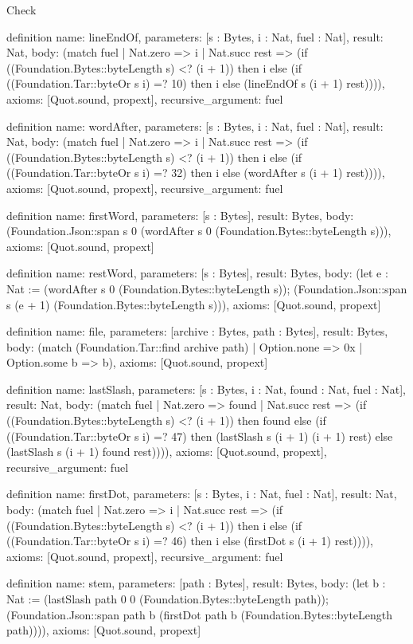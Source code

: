 \begin{lexlean}{Check}
\begin{semanticmodule}
definition{
  name: lineEndOf,
  parameters: [s : Bytes, i : Nat, fuel : Nat],
  result: Nat,
  body: (match fuel
    | Nat.zero => i
    | Nat.succ rest => (if ((Foundation.Bytes::byteLength s) <? (i + 1)) then i else (if ((Foundation.Tar::byteOr s i) =? 10) then i else (lineEndOf s (i + 1) rest)))),
  axioms: [Quot.sound, propext],
  recursive_argument: fuel
}

definition{
  name: wordAfter,
  parameters: [s : Bytes, i : Nat, fuel : Nat],
  result: Nat,
  body: (match fuel
    | Nat.zero => i
    | Nat.succ rest => (if ((Foundation.Bytes::byteLength s) <? (i + 1)) then i else (if ((Foundation.Tar::byteOr s i) =? 32) then i else (wordAfter s (i + 1) rest)))),
  axioms: [Quot.sound, propext],
  recursive_argument: fuel
}

definition{
  name: firstWord,
  parameters: [s : Bytes],
  result: Bytes,
  body: (Foundation.Json::span s 0 (wordAfter s 0 (Foundation.Bytes::byteLength s))),
  axioms: [Quot.sound, propext]
}

definition{
  name: restWord,
  parameters: [s : Bytes],
  result: Bytes,
  body: (let e : Nat := (wordAfter s 0 (Foundation.Bytes::byteLength s)); (Foundation.Json::span s (e + 1) (Foundation.Bytes::byteLength s))),
  axioms: [Quot.sound, propext]
}

definition{
  name: file,
  parameters: [archive : Bytes, path : Bytes],
  result: Bytes,
  body: (match (Foundation.Tar::find archive path) | Option.none => 0x | Option.some b => b),
  axioms: [Quot.sound, propext]
}

definition{
  name: lastSlash,
  parameters: [s : Bytes, i : Nat, found : Nat, fuel : Nat],
  result: Nat,
  body: (match fuel
    | Nat.zero => found
    | Nat.succ rest => (if ((Foundation.Bytes::byteLength s) <? (i + 1)) then found else (if ((Foundation.Tar::byteOr s i) =? 47) then (lastSlash s (i + 1) (i + 1) rest) else (lastSlash s (i + 1) found rest)))),
  axioms: [Quot.sound, propext],
  recursive_argument: fuel
}

definition{
  name: firstDot,
  parameters: [s : Bytes, i : Nat, fuel : Nat],
  result: Nat,
  body: (match fuel
    | Nat.zero => i
    | Nat.succ rest => (if ((Foundation.Bytes::byteLength s) <? (i + 1)) then i else (if ((Foundation.Tar::byteOr s i) =? 46) then i else (firstDot s (i + 1) rest)))),
  axioms: [Quot.sound, propext],
  recursive_argument: fuel
}

definition{
  name: stem,
  parameters: [path : Bytes],
  result: Bytes,
  body: (let b : Nat := (lastSlash path 0 0 (Foundation.Bytes::byteLength path)); (Foundation.Json::span path b (firstDot path b (Foundation.Bytes::byteLength path)))),
  axioms: [Quot.sound, propext]
}


\end{semanticmodule}
\end{lexlean}
